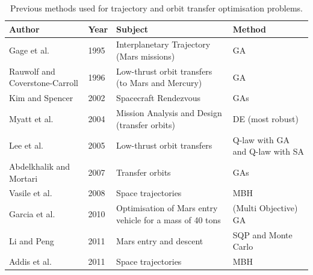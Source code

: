 \begin{table}[!ht]
\begin{center}
\caption{Previous methods used for trajectory and orbit transfer optimisation problems.}
\label{tab:prevmeth}
\begin{tabular}{|p{5cm}|l|p{5cm}|p{5cm}|}
\hline 
\textbf{Author} 		& \textbf{Year} & \textbf{Subject} & \textbf{Method} \\ \hline \hline
Gage et al. \cite{gage1995} & 1995		& Interplanetary Trajectory (Mars missions) & \ac{GA}  \\ \hline
Rauwolf and Coverstone-Carroll \cite{rauwolf1996} 		& 1996 & Low-thrust orbit transfers (to Mars and Mercury) & \ac{GA}  \\ \hline
Kim and Spencer \cite{kim2002} & 2002		& Spacecraft Rendezvous  & \ac{GA}s  \\ \hline
Myatt et al. \cite{myatt2004} 	& 2004	& Mission Analysis and Design (transfer orbits) & \ac{DE} (most robust)  \\ \hline
Lee et al. \cite{lee2005} & 2005		& Low-thrust orbit transfers &  Q-law with \ac{GA} and Q-law with \ac{SA} \\ \hline
Abdelkhalik and Mortari \cite{abdelkhalik2007} & 2007 & Transfer orbits &  \ac{GA}s \\ \hline
Vasile et al. \cite{vasile2008} & 2008		& Space trajectories & \ac{MBH}  \\ \hline
Garcia et al. \cite{garcia2010} & 2010		& Optimisation of Mars entry vehicle for a mass of 40 tons & (Multi Objective) \ac{GA}  \\ \hline
Li and Peng \cite{shuang2011} 	& 2011	& Mars entry and descent &  \ac{SQP} and Monte Carlo \\ \hline
Addis et al. \cite{addis2011} & 2011		& Space trajectories &  \ac{MBH} \\ \hline

 		
\end{tabular}
\end{center}
\end{table}





